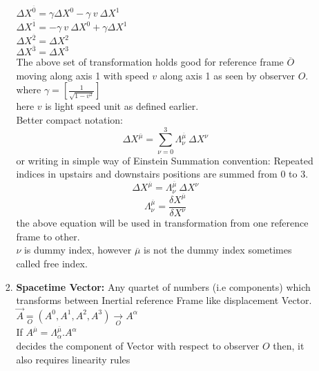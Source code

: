 \documentclass[11pt,a4paper]{article}
\begin{document}
\begin{enumerate}
\begin{enumerate}
\begin{enumerate}
                              $\Delta {X^{\overline{0}}}=\gamma {\Delta X^0} - \gamma\ v\ {\Delta X^1}$\\
                              $\Delta {X^{\overline{1}}}=-\gamma\ v\ {\Delta X^0} + \gamma{\Delta X^1}$\\
                              $\Delta {X^{\overline{2}}}={\Delta X^2}$\\
                              $\Delta {X^{\overline{3}}}={\Delta X^3}$\\
                              The above set of transformation holds good for reference frame $\overline{O}$ moving along axis 1 with speed $v$ along axis 1 as seen by observer $O$.\\
                              where $\gamma  = \left[\frac{1}{\sqrt{1-v^2}}\right]$\\
                              here $v$ is light speed unit as defined earlier.\\
                              Better compact notation:\\
                              \[\Delta X^{\overline{\mu}}=\sum_{\nu = 0}^{3}\Lambda^{\overline{\mu}}_{\nu}\ \Delta X^{\nu}\]
                              or  writing in simple way of Einstein Summation convention: Repeated indices in upstairs and downstairs positions are summed from 0 to 3.
                              \[\Delta X^{\overline{\mu}}=\Lambda^{\overline{\mu}}_{\nu}\ \Delta X^{\nu}\]
                              \[\Lambda^{\overline{\mu}}_{\nu}=\frac{\delta X^{\overline{\mu}}}{ \delta X^{\nu}}\]
                              the above equation will be used in transformation from one reference frame to other.\\
                              $\nu$ is dummy index, however $\overline{\mu}$ is not the dummy index sometimes called free index.
                        \item \textbf{Spacetime Vector:}
                              Any quartet of numbers (i.e components) which transforms between Inertial reference Frame like displacement Vector.\\
                              $\vec{A} \mathop = \limits^{}_{O} \left(A^0,A^1,A^2,A^3\right)\mathop \rightarrow \limits^{}_{O} {A^{\alpha}}$\\
                              If $A^{\overline{\mu}}=\Lambda^{\overline{\mu}}_{\alpha}.A^{\alpha}$\\ decides the component of Vector with respect to observer $O$ then, it also requires linearity rules\\

\end{enumerate}
\end{enumerate}
\end{enumerate}
\end{document}
